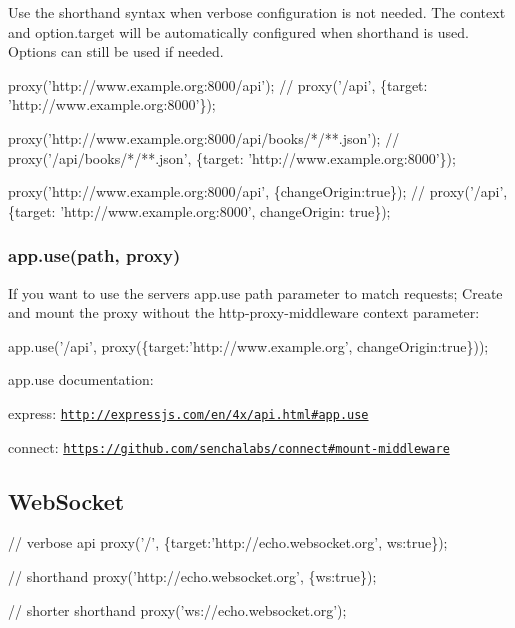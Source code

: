Use the shorthand syntax when verbose configuration is not needed. The {\ttfamily context} and {\ttfamily option.\+target} will be automatically configured when shorthand is used. Options can still be used if needed.


\begin{DoxyCode}
proxy('http://www.example.org:8000/api');
// proxy('/api', \{target: 'http://www.example.org:8000'\});


proxy('http://www.example.org:8000/api/books/*/**.json');
// proxy('/api/books/*/**.json', \{target: 'http://www.example.org:8000'\});


proxy('http://www.example.org:8000/api', \{changeOrigin:true\});
// proxy('/api', \{target: 'http://www.example.org:8000', changeOrigin: true\});
\end{DoxyCode}


\subsubsection*{app.\+use(path, proxy)}

If you want to use the server\textquotesingle{}s {\ttfamily app.\+use} {\ttfamily path} parameter to match requests; Create and mount the proxy without the http-\/proxy-\/middleware {\ttfamily context} parameter\+: 
\begin{DoxyCode}
app.use('/api', proxy(\{target:'http://www.example.org', changeOrigin:true\}));
\end{DoxyCode}


{\ttfamily app.\+use} documentation\+:
\begin{DoxyItemize}
\item express\+: \href{http://expressjs.com/en/4x/api.html#app.use}{\tt http\+://expressjs.\+com/en/4x/api.\+html\#app.\+use}
\item connect\+: \href{https://github.com/senchalabs/connect#mount-middleware}{\tt https\+://github.\+com/senchalabs/connect\#mount-\/middleware}
\end{DoxyItemize}

\subsection*{Web\+Socket}


\begin{DoxyCode}
// verbose api
proxy('/', \{target:'http://echo.websocket.org', ws:true\});

// shorthand
proxy('http://echo.websocket.org', \{ws:true\});

// shorter shorthand
proxy('ws://echo.websocket.org');
\end{DoxyCode}


